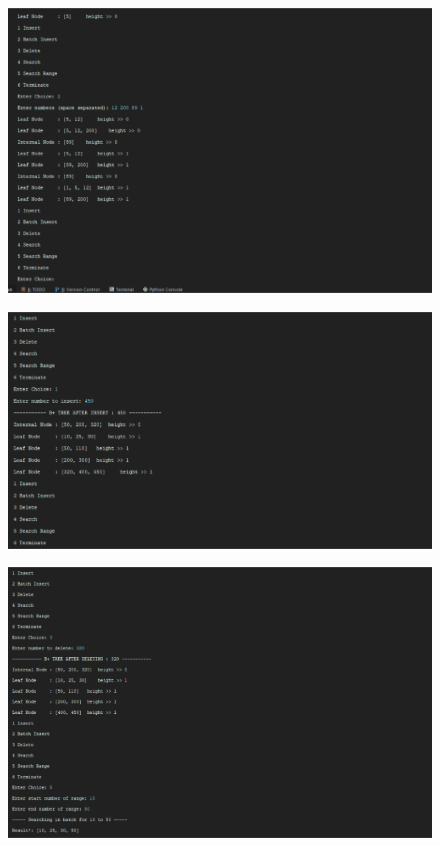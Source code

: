 \documentclass[paper=letter, fontsize=12pt]{article}
\begin{document}
\begin{figure}[H]
	\includegraphics*[width=440px]{02.png}
\end{figure}

\begin{figure}[H]
	\includegraphics*[width=440px]{03.png}
\end{figure}

\begin{figure}[H]
	\includegraphics*[width=440px]{04.png}
\end{figure}
\end{document}
